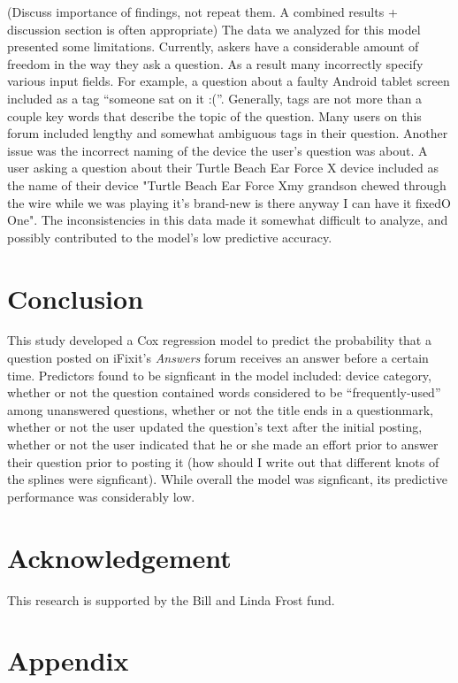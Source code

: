 \documentclass{article}
\begin{document}
(Discuss importance of findings, not repeat them. A combined results + discussion section is often appropriate) 
The data we analyzed for this model presented some limitations. Currently, askers have a considerable amount of freedom in the way they ask a question. As a result many incorrectly specify various input fields. For example, a question about a faulty Android tablet screen included as a tag ``someone sat on it :(''. Generally, tags are not more than a couple key words that describe the topic of the question. Many users on this forum included lengthy and somewhat ambiguous tags in their question. Another issue was the incorrect naming of the device the user's question was about. A user asking a question about their Turtle Beach Ear Force X device included as the name of their device "Turtle Beach Ear Force Xmy grandson chewed through the wire while we was playing it's brand-new is there anyway I can have it fixedO One". The inconsistencies in this data made it somewhat difficult to analyze, and possibly contributed to the model's low predictive accuracy. 

\section*{Conclusion}

This study developed a Cox regression model to predict the probability that a question posted on iFixit's \textit{Answers} forum receives an answer before a certain time. Predictors found to be signficant in the model included: device category, whether or not the question contained words considered to be ``frequently-used'' among unanswered questions, whether or not the title ends in a questionmark, whether or not the user updated the question's text after the initial posting, whether or not the user indicated that he or she made an effort prior to answer their question prior to posting it (how should I write out that different knots of the splines were signficant). While overall the model was signficant, its predictive performance was considerably low. 

\section*{Acknowledgement}

This research is supported by the Bill and Linda Frost fund. 

\section{Appendix} 
\end{document}
